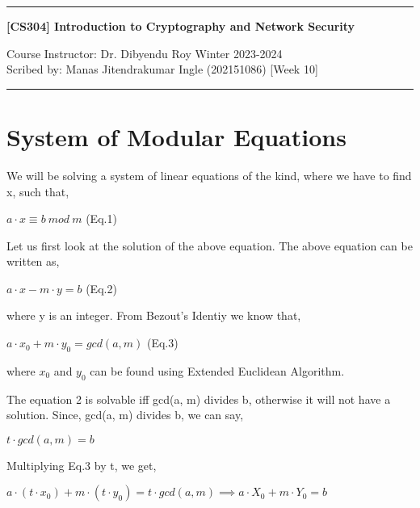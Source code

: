 \documentclass[11pt]{article}
\begin{document}
\noindent
\rule{\textwidth}{1pt}
\begin{center}
{\bf [CS304] Introduction to Cryptography and Network Security}
\end{center}
Course Instructor: Dr. Dibyendu Roy \hfill Winter 2023-2024\\
Scribed by: Manas Jitendrakumar Ingle (202151086) \hfill [Week 10]
\\
\rule{\textwidth}{1pt}

\section{System of Modular Equations}
We will be solving a system of linear equations of the kind, where we have to find x, such that,
\begin{center}
    $a \cdot x \equiv b \ mod \ m$    (Eq.1)
\end{center}
Let us first look at the solution of the above equation. The above equation can be written as,
\begin{center}
    $a \cdot x - m \cdot y = b$     (Eq.2)
\end{center}
where y is an integer. From Bezout's Identiy we know that, 
\begin{center}
    $a \cdot x_0 + m \cdot y_0 = gcd(a, m)$    (Eq.3)
\end{center}
where $x_0$ and $y_0$ can be found using Extended Euclidean Algorithm.

The equation 2 is solvable iff gcd(a, m) divides b, otherwise it will not have a solution. Since, gcd(a, m) divides b, we can say,
\begin{center}
    $t \cdot gcd(a, m) = b$
\end{center}
Multiplying Eq.3 by t, we get, 
\begin{center}
    $a \cdot (t \cdot x_0) + m \cdot (t\cdot y_0) = t \cdot gcd(a, m) \implies a \cdot  X_0 + m \cdot Y_0 = b$
\end{center}
\end{document}
